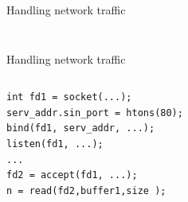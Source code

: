 \documentclass{beamer}
\begin{document}
\begin{frame}[fragile]{Handling network traffic}
\begin{columns}
\begin{column}[t]{0.5\textwidth}
\begin{center}
{     }
\end{center}
\end{column}
\end{columns}
\end{frame}

\begin{frame}[fragile]{Handling network traffic}
\begin{columns}
\begin{column}[t]{0.5\textwidth}
\begin{verbatim}
int fd1 = socket(...);
serv_addr.sin_port = htons(80);
bind(fd1, serv_addr, ...);
listen(fd1, ...);
...
fd2 = accept(fd1, ...);
n = read(fd2,buffer1,size );
\end{verbatim}
\end{column}
\begin{column}[t]{0.5\textwidth}  %
    \begin{center}
\end{center}
\end{column}
\end{columns}
\end{frame}
\end{document}
